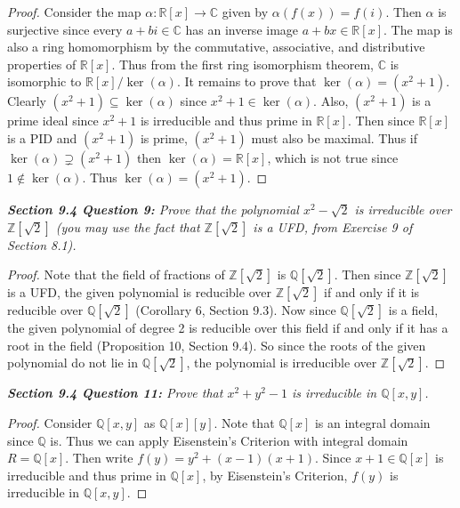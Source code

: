 \documentclass{article}
\begin{document}
  \begin{proof}
    Consider the map $\alpha:\mathbb{R}[x]\rightarrow\mathbb{C}$ given by
    $\alpha(f(x))=f(i)$. Then $\alpha$ is surjective since every
    $a+bi\in\mathbb{C}$ has an inverse image $a+bx\in\mathbb{R}[x]$. The
    map is also a ring homomorphism by the commutative, associative, and
    distributive properties of $\mathbb{R}[x]$. Thus from the first ring
    isomorphism theorem, $\mathbb{C}$ is isomorphic to
    $\mathbb{R}[x]/\ker(\alpha)$. It remains to prove that
    $\ker(\alpha)=(x^2+1)$. Clearly $(x^2+1)\subseteq\ker(\alpha)$ since
    $x^2+1\in\ker(\alpha)$. Also, $(x^2+1)$ is a prime ideal since $x^2+1$
    is irreducible and thus prime in $\mathbb{R}[x]$. Then since
    $\mathbb{R}[x]$ is a PID and $(x^2+1)$ is prime, $(x^2+1)$ must also be
    maximal. Thus if $\ker(\alpha)\supsetneq(x^2+1)$ then
    $\ker(\alpha)=\mathbb{R}[x]$, which is not true since
    $1\not\in\ker(\alpha)$. Thus $\ker(\alpha)=(x^2+1)$.
  \end{proof}

\it \textbf{Section 9.4 Question 9:} Prove that the polynomial
  $x^2-\sqrt{2}$ is irreducible over $\mathbb{Z}[\sqrt{2}]$ (you may use
  the fact that $\mathbb{Z}[\sqrt{2}]$ is a UFD, from Exercise 9 of Section
  8.1).

  \begin{proof}
    Note that the field of fractions of $\mathbb{Z}[\sqrt{2}]$ is
    $\mathbb{Q}[\sqrt{2}]$. Then since $\mathbb{Z}[\sqrt{2}]$ is a UFD, the
    given polynomial is reducible over $\mathbb{Z}[\sqrt{2}]$ if and only
    if it is reducible over $\mathbb{Q}[\sqrt{2}]$ (Corollary 6, Section
    9.3). Now since $\mathbb{Q}[\sqrt{2}]$ is a field, the given polynomial
    of degree 2 is reducible over this field if and only if it has a root
    in the field (Proposition 10, Section 9.4). So since the roots of the
    given polynomial do not lie in $\mathbb{Q}[\sqrt{2}]$, the polynomial
    is irreducible over $\mathbb{Z}[\sqrt{2}]$.
  \end{proof}

\it \textbf{Section 9.4 Question 11:} Prove that $x^2+y^2-1$ is irreducible
  in $\mathbb{Q}[x,y]$.
  \begin{proof}
    Consider $\mathbb{Q}[x,y]$ as $\mathbb{Q}[x][y]$. Note that
    $\mathbb{Q}[x]$ is an integral domain since $\mathbb{Q}$ is. Thus we
    can apply Eisenstein's Criterion with integral domain
    $R=\mathbb{Q}[x]$. Then write $f(y)=y^2+(x-1)(x+1)$. Since
    $x+1\in\mathbb{Q}[x]$ is irreducible and thus prime in $\mathbb{Q}[x]$,
    by Eisenstein's Criterion, $f(y)$ is irreducible in $\mathbb{Q}[x,y]$.
  \end{proof}
\end{document}
